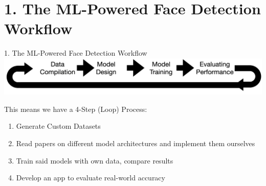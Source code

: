 \documentclass{beamer}
\begin{document}
\section{1. The ML-Powered Face Detection Workflow}
\begin{frame}{1. The ML-Powered Face Detection Workflow}
    \vspace{1 cm}
    \includegraphics[height = 1.5 cm]{images/workflow.png} \par
    \vspace{1 cm}
    This means we have a 4-Step (Loop) Process: \par
    \begin{enumerate}
        \item Generate Custom Datasets
        \item Read papers on different model architectures and implement them ourselves
        \item Train said models with own data, compare results
        \item Develop an app to evaluate real-world accuracy
    \end{enumerate}
\end{frame}
\end{document}
